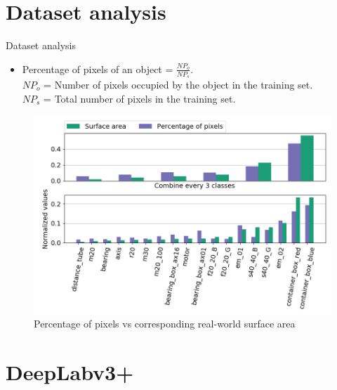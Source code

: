 \documentclass{beamer}
\begin{document}
\section{Dataset analysis}

\begin{frame}{Dataset analysis}
\label{slide:analysis}
	\begin{small}
	\begin{itemize}
		\item Percentage of pixels of an object = $\frac{NP_o}{NP_s}$. \\
		$NP_o$ = Number of pixels occupied by the object in the training set. \\ $NP_s$ = Total number of pixels in the training set.
	\end{itemize}
	\begin{figure}
		\centering
		\includegraphics[scale=0.35]{images/analyzer_full}
		\captionsetup{justification=centering,margin=0.2cm}
		\caption{Percentage of pixels vs corresponding real-world surface area}
		\label{Fig:surarea}
	\end{figure}
	\end{small}

\end{frame}

\section{DeepLabv3+}
\end{document}
